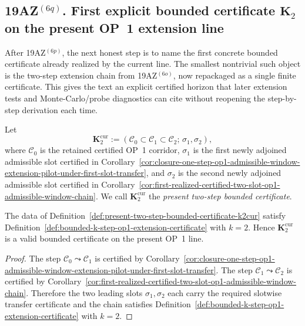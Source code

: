 \subsection*{19AZ$^{(6q)}$. First explicit bounded certificate $\mathbf K_2$ on the present OP~1 extension line}
\label{sec:first-explicit-bounded-certificate-k2-on-present-op1-extension-line}
After 19AZ$^{(6p)}$, the next honest step is to name the first concrete bounded certificate already realized by the current line. The smallest nontrivial such object is the two-step extension chain from 19AZ$^{(6o)}$, now repackaged as a single finite certificate. This gives the text an explicit certified horizon that later extension tests and Monte-Carlo/probe diagnostics can cite without reopening the step-by-step derivation each time.

\begin{definition}
\label{def:present-two-step-bounded-certificate-k2cur}
Let
\[
 \mathbf K_2^{\mathrm{cur}}:=(\mathcal C_0\subset \mathcal C_1\subset \mathcal C_2;\,\sigma_1,\sigma_2),
\]
where $\mathcal C_0$ is the retained certified OP~1 corridor, $\sigma_1$ is the first newly adjoined admissible slot certified in Corollary~\ref{cor:closure-one-step-op1-admissible-window-extension-pilot-under-first-slot-transfer}, and $\sigma_2$ is the second newly adjoined admissible slot certified in Corollary~\ref{cor:first-realized-certified-two-slot-op1-admissible-window-chain}. We call $\mathbf K_2^{\mathrm{cur}}$ the \emph{present two-step bounded certificate}.
\end{definition}

\begin{proposition}
\label{prop:current-op1-line-carries-explicit-bounded-certificate-k2cur}
The data of Definition~\ref{def:present-two-step-bounded-certificate-k2cur} satisfy Definition~\ref{def:bounded-k-step-op1-extension-certificate} with $k=2$. Hence $\mathbf K_2^{\mathrm{cur}}$ is a valid bounded certificate on the present OP~1 line.
\end{proposition}

\begin{proof}
The step $\mathcal C_0\leadsto\mathcal C_1$ is certified by Corollary~\ref{cor:closure-one-step-op1-admissible-window-extension-pilot-under-first-slot-transfer}. The step $\mathcal C_1\leadsto\mathcal C_2$ is certified by Corollary~\ref{cor:first-realized-certified-two-slot-op1-admissible-window-chain}. Therefore the two leading slots $\sigma_1,\sigma_2$ each carry the required slotwise transfer certificate and the chain satisfies Definition~\ref{def:bounded-k-step-op1-extension-certificate} with $k=2$.
\end{proof}

